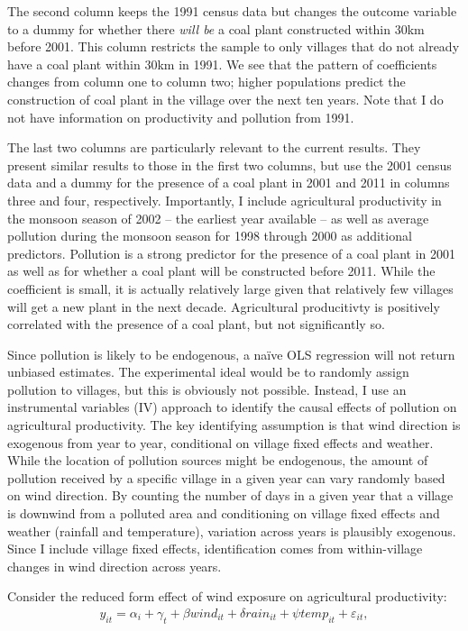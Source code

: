 \documentclass[
]{article}
\begin{document}
The second column keeps the 1991 census data but changes the outcome variable to a dummy for whether there \emph{will be} a coal plant constructed within 30km before 2001. This column restricts the sample to only villages that do not already have a coal plant within 30km in 1991. We see that the pattern of coefficients changes from column one to column two; higher populations predict the construction of coal plant in the village over the next ten years. Note that I do not have information on productivity and pollution from 1991.

The last two columns are particularly relevant to the current results. They present similar results to those in the first two columns, but use the 2001 census data and a dummy for the presence of a coal plant in 2001 and 2011 in columns three and four, respectively. Importantly, I include agricultural productivity in the monsoon season of 2002 -- the earliest year available -- as well as average pollution during the monsoon season for 1998 through 2000 as additional predictors. Pollution is a strong predictor for the presence of a coal plant in 2001 as well as for whether a coal plant will be constructed before 2011. While the coefficient is small, it is actually relatively large given that relatively few villages will get a new plant in the next decade. Agricultural producitivty is positively correlated with the presence of a coal plant, but not significantly so.

Since pollution is likely to be endogenous, a naïve OLS regression will not return unbiased estimates. The experimental ideal would be to randomly assign pollution to villages, but this is obviously not possible. Instead, I use an instrumental variables (IV) approach to identify the causal effects of pollution on agricultural productivity. The key identifying assumption is that wind direction is exogenous from year to year, conditional on village fixed effects and weather. While the location of pollution sources might be endogenous, the amount of pollution received by a specific village in a given year can vary randomly based on wind direction. By counting the number of days in a given year that a village is downwind from a polluted area and conditioning on village fixed effects and weather (rainfall and temperature), variation across years is plausibly exogenous. Since I include village fixed effects, identification comes from within-village changes in wind direction across years.

Consider the reduced form effect of wind exposure on agricultural productivity:
\begin{gather} y_{it} = \alpha_{i} + \gamma_{t} + \beta wind_{it} + \delta rain_{it} + \psi temp_{it} + \varepsilon_{it}, \end{gather}
\end{document}
